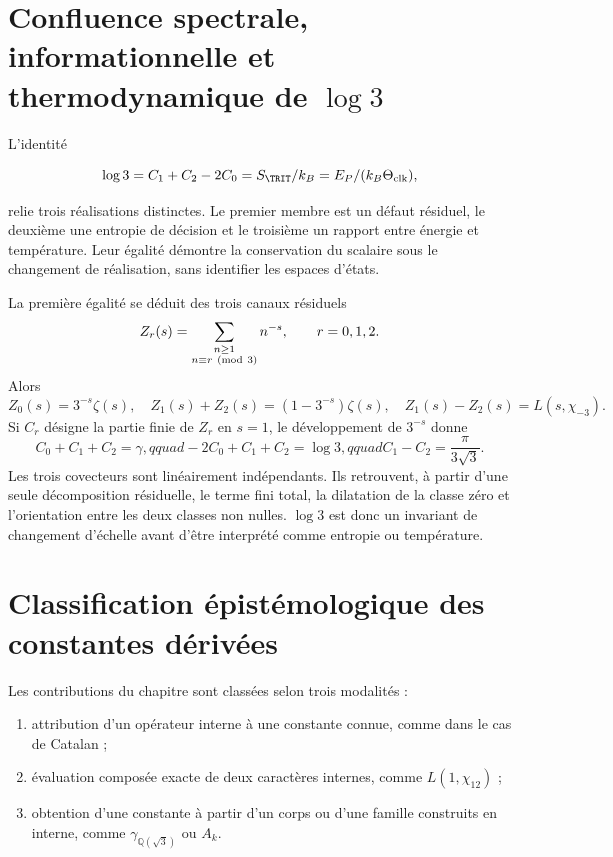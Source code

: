 \section{Confluence spectrale, informationnelle et thermodynamique de \(\log3\)}

L’identité

\[
\log3=C_1+C_2-2C_0
=S_{\TRIT}/k_B
=E_P/(k_B\Theta_{\rm clk}),
\]

relie trois réalisations distinctes. Le premier membre est un défaut
résiduel, le deuxième une entropie de décision et le troisième un rapport
entre énergie et température. Leur égalité démontre la conservation du
scalaire sous le changement de réalisation, sans identifier les espaces
d'états.

La première égalité se déduit des trois canaux
résiduels
\[
Z_r(s)=\sum_{\substack{n\ge1\\n\equiv r\ ({\rm mod}\ 3)}}n^{-s},
\qquad r=0,1,2.
\]
Alors
\[
Z_0(s)=3^{-s}\zeta(s),\quad
Z_1(s)+Z_2(s)=(1-3^{-s})\zeta(s),\quad
Z_1(s)-Z_2(s)=L(s,\chi_{-3}).
\]
Si \(C_r\) désigne la partie finie de \(Z_r\) en \(s=1\), le développement
de \(3^{-s}\) donne
\begin{equation}
C_0+C_1+C_2=\gamma,qquad
-2C_0+C_1+C_2=\log3,qquad
C_1-C_2=\frac{\pi}{3\sqrt3}.
\label{eq:residual-three-covectors}
\end{equation}
Les trois covecteurs sont linéairement indépendants. Ils retrouvent, à partir d'une seule
décomposition résiduelle, le terme fini total, la dilatation de la
classe zéro et l'orientation entre les deux classes non nulles. \(\log3\) est
donc un invariant de changement d'échelle avant d'être interprété comme
entropie ou température.

\section{Classification épistémologique des constantes dérivées}

Les contributions du chapitre sont classées selon trois modalités :

\begin{enumerate}
\item attribution d'un opérateur interne à une constante connue, comme dans
le cas de Catalan ;
\item évaluation composée exacte de deux caractères internes, comme
\(L(1,\chi_{12})\) ;
\item obtention d'une constante à partir d'un corps ou d'une famille
construits en interne, comme \(\gamma_{\mathbb Q(\sqrt3)}\) ou \(A_k\).
\end{enumerate}

